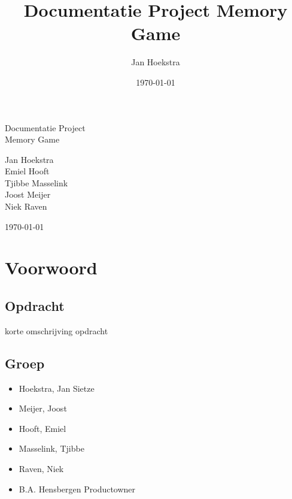 \documentclass[a4paper,titlepage,11pt]{article}
\title{Documentatie Project Memory Game}
\date{\today}
\author{Jan Hoekstra}
\def\myauthor{Jan Hoekstra} %
\def\mytitle{Documentatie Project} %
\def\mysubtitle{Memory Game}
\def\mydate{\today} %
\def\mycoauthors{
Emiel Hooft \\
Tjibbe Masselink \\
Joost Meijer \\
Niek Raven
}
\begin{document}

\begin{titlepage}
\vspace{5cm}

\centering
\vspace*{\fill}
\parbox[c][5cm][t]{10cm}{
  \color{white}\Huge\centering

  \mytitle \\
  \mysubtitle
  
  \vspace{3cm}
\huge
  \myauthor \\
  \mycoauthors
  
  \vspace{3cm}

  \mydate
}
\vspace*{\fill}

\end{titlepage}
\tableofcontents
{}

\section{Voorwoord}

\subsection{Opdracht}

korte omschrijving opdracht

\subsection{Groep}

\begin{itemize}
\item Hoekstra, Jan Sietze
\item Meijer, Joost
\item Hooft, Emiel
\item Masselink, Tjibbe
\item Raven, Niek
\item B.A. Hensbergen \- Productowner
\end{itemize}

\clearpage
\end{document}
